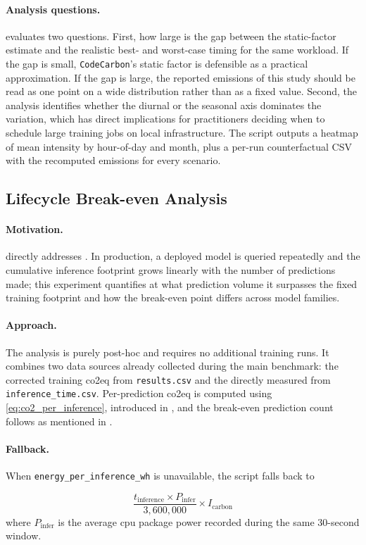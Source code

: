 \paragraph{Analysis questions.}
 evaluates two questions. First, how large is the gap between the static-factor estimate and the realistic best- and worst-case timing for the same workload. If the gap is small, \texttt{CodeCarbon}'s static factor is defensible as a practical approximation. If the gap is large, the reported emissions of this study should be read as one point on a wide distribution rather than as a fixed value. Second, the analysis identifies whether the diurnal or the seasonal axis dominates the variation, which has direct implications for practitioners deciding when to schedule large training jobs on local infrastructure. The script outputs a heatmap of mean intensity by hour-of-day and month, plus a per-run counterfactual CSV with the recomputed emissions for every scenario.

\subsection{Lifecycle Break-even Analysis}
\label{design_lifecycle}\label{exp:5}

\paragraph{Motivation.}
 directly addresses . In production, a deployed model is queried repeatedly and the cumulative inference footprint grows linearly with the number of predictions made; this experiment quantifies at what prediction volume it surpasses the fixed training footprint and how the break-even point differs across model families.

\paragraph{Approach.}
The analysis is purely post-hoc and requires no additional training runs. It combines two data sources already collected during the main benchmark: the corrected training \gls{co2eq} from \texttt{results.csv} and the directly measured  from \texttt{inference\_time.csv}. Per-prediction \gls{co2eq} is computed using \eqref{eq:co2_per_inference}, introduced in , and the break-even prediction count follows as mentioned in .

\paragraph{Fallback.}
When \texttt{energy\_per\_inference\_wh} is unavailable, the script falls back to

\begin{equation}
\frac{t_{\text{inference}} \times P_{\text{infer}}}{3{,}600{,}000} \times I_{\text{carbon}}
\end{equation}
where $P_{\text{infer}}$ is the average \gls{cpu} package power recorded during the same 30-second window.
